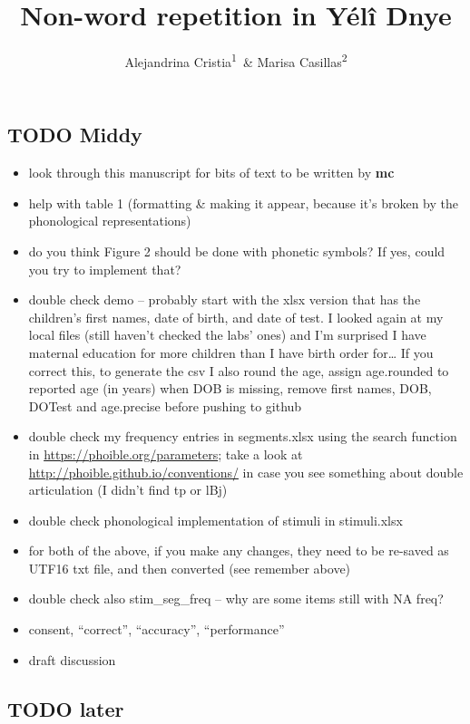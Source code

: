 \documentclass[english,,man,floatsintext]{apa6}
\affiliation{
\vspace{0.5cm}
\textsuperscript{1} Laboratoire de Sciences Cognitives et de Psycholinguistique, Département d'Etudes cognitives, ENS, EHESS, CNRS, PSL University\\\textsuperscript{2} Max Planck Institute for Psycholinguistics}
\title{Non-word repetition in Yélî Dnye}
\author{Alejandrina Cristia\textsuperscript{1}~\& Marisa
Casillas\textsuperscript{2}}
\date{}
\providecommand{\tightlist}{%
  \setlength{\itemsep}{0pt}\setlength{\parskip}{0pt}}
\begin{document}
\maketitle

\subsection{TODO Middy}\label{todo-middy}

\begin{itemize}
\tightlist
\item
  look through this manuscript for bits of text to be written by
  \textbf{mc}
\item
  help with table 1 (formatting \& making it appear, because it's broken
  by the phonological representations)
\item
  do you think Figure 2 should be done with phonetic symbols? If yes,
  could you try to implement that?
\item
  double check demo -- probably start with the xlsx version that has the
  children's first names, date of birth, and date of test. I looked
  again at my local files (still haven't checked the labs' ones) and I'm
  surprised I have maternal education for more children than I have
  birth order for\ldots{} If you correct this, to generate the csv I
  also round the age, assign age.rounded to reported age (in years) when
  DOB is missing, remove first names, DOB, DOTest and age.precise before
  pushing to github
\item
  double check my frequency entries in segments.xlsx using the search
  function in \url{https://phoible.org/parameters}; take a look at
  \url{http://phoible.github.io/conventions/} in case you see something
  about double articulation (I didn't find tp or lBj)
\item
  double check phonological implementation of stimuli in stimuli.xlsx
\item
  for both of the above, if you make any changes, they need to be
  re-saved as UTF16 txt file, and then converted (see remember above)
\item
  double check also stim\_seg\_freq -- why are some items still with NA
  freq?
\item
  consent, \enquote{correct}, \enquote{accuracy}, \enquote{performance}
\item
  draft discussion
\end{itemize}

\subsection{TODO later}\label{todo-later}
\end{document}
